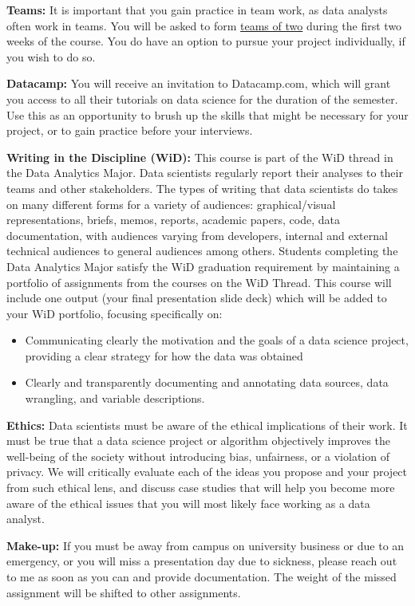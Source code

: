 \documentclass[11pt,letter]{article}
\begin{document}
\textbf{Teams:} It is important that you gain practice in team work, as data analysts often work in teams. You will be asked to form \underline{teams of two} during the first two weeks of the course. You do have an option to pursue your project individually, if you wish to do so.

\textbf{Datacamp:} You will receive an invitation to Datacamp.com, which will grant you access to all their tutorials on data science for the duration of the semester. Use this as an opportunity to brush up the skills that might be necessary for your project, or to gain practice before your interviews.

\textbf{Writing in the Discipline (WiD):} This course is part of the WiD thread in the Data Analytics Major.
Data scientists regularly report their analyses to their teams and other stakeholders. The types of writing that data scientists do takes on many different forms for a variety of audiences:
graphical/visual representations, briefs, memos, reports, academic papers, code, data documentation, with audiences varying from developers, internal and external technical audiences to general audiences among others. Students
completing the Data Analytics Major satisfy the WiD graduation requirement by maintaining a portfolio
of assignments from the courses on the WiD Thread. This course will include one output (your final presentation slide deck) which will be added to your WiD portfolio, focusing specifically on:\\[-9mm]
\begin{itemize}
\item Communicating clearly the motivation and the goals of a data science project, providing a clear strategy for how the data was obtained
\item Clearly and transparently documenting and annotating data sources, data wrangling, and variable descriptions.
\end{itemize}

\textbf{Ethics:} Data scientists must be aware of the ethical implications of their work. It must be true that a data science project or algorithm objectively improves the well-being of the society without introducing bias, unfairness, or a violation of privacy. We will critically evaluate each of the ideas you propose and your project from such ethical lens, and discuss case studies that will help you become more aware of the ethical issues that you will most likely face working as a data analyst.

\textbf{Make-up:} If you must be away from campus on university business or due to an emergency, or you will miss a presentation day due to sickness, please reach out to me as soon as you can and provide documentation. The weight of the missed assignment will be shifted to other assignments.
\end{document}
